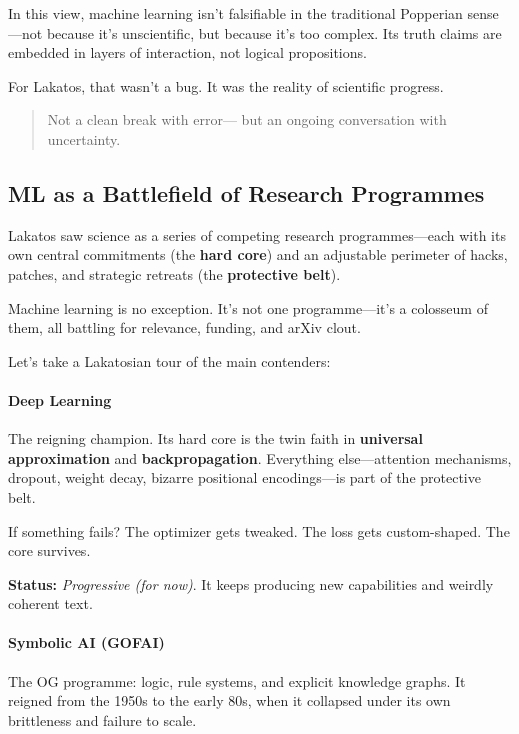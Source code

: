 \bigskip

In this view, machine learning isn’t falsifiable in the traditional Popperian sense—not because it’s unscientific, but because it’s too complex. Its truth claims are embedded in layers of interaction, not logical propositions.

For Lakatos, that wasn’t a bug. It was the reality of scientific progress.

\begin{quote}
    Not a clean break with error—  
    but an ongoing conversation with uncertainty.
\end{quote}


\subsection{ML as a Battlefield of Research Programmes}

Lakatos saw science as a series of competing research programmes—each with its own central commitments (the \textbf{hard core}) and an adjustable perimeter of hacks, patches, and strategic retreats (the \textbf{protective belt}). 

Machine learning is no exception. It’s not one programme—it’s a colosseum of them, all battling for relevance, funding, and arXiv clout.

\bigskip

Let’s take a Lakatosian tour of the main contenders:

\paragraph{Deep Learning}  
The reigning champion. Its hard core is the twin faith in \textbf{universal approximation} and \textbf{backpropagation}. Everything else—attention mechanisms, dropout, weight decay, bizarre positional encodings—is part of the protective belt. 

If something fails? The optimizer gets tweaked. The loss gets custom-shaped. The core survives.

\textbf{Status:} \textit{Progressive (for now)}. It keeps producing new capabilities and weirdly coherent text.

\paragraph{Symbolic AI (GOFAI)}  
The OG programme: logic, rule systems, and explicit knowledge graphs. It reigned from the 1950s to the early 80s, when it collapsed under its own brittleness and failure to scale.

